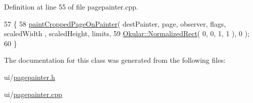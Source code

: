 Definition at line 55 of file pagepainter.\+cpp.


\begin{DoxyCode}
57 \{
58         \hyperlink{classPagePainter_af6d636a41a9b1ebe8954c53bf5e3e6ec}{paintCroppedPageOnPainter}( destPainter, page, observer, flags, scaledWidth
      , scaledHeight, limits,
59                                    \hyperlink{classOkular_1_1NormalizedRect}{Okular::NormalizedRect}( 0, 0, 1, 1 ), 0 );
60 \}
\end{DoxyCode}


The documentation for this class was generated from the following files\+:\begin{DoxyCompactItemize}
\item 
ui/\hyperlink{pagepainter_8h}{pagepainter.\+h}\item 
ui/\hyperlink{pagepainter_8cpp}{pagepainter.\+cpp}\end{DoxyCompactItemize}
